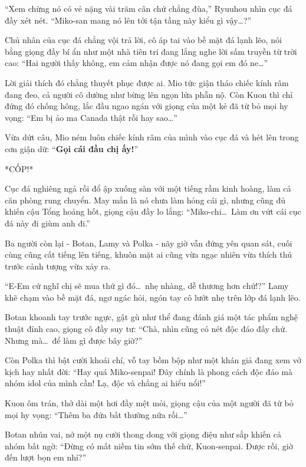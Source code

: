 \documentclass[../main.tex]{subfiles}
\begin{document}
``Xem chừng nó có vẻ nặng vài trăm cân chứ chẳng đùa,'' Ryuuhou nhìn cục đá đầy xét nét. ``Miko-san mang nó lên tới tận tầng này kiểu gì vậy\dots?''

Chủ nhân của cục đá chẳng vội trả lời, cô áp tai vào bề mặt đá lạnh lẽo, nói bằng giọng đầy bí ẩn như một nhà tiên tri đang lắng nghe lời sấm truyền từ trời cao: ``Hai người thấy không, em cảm nhận được nó đang gọi em đó ne\dots''

Lời giải thích đó chẳng thuyết phục được ai. Mio tức giận tháo chiếc kính râm đang đeo, cả người cô dường như bừng lên ngọn lửa phẫn nộ. Còn Kuon thì chỉ đứng đó chống hông, lắc đầu ngao ngán với giọng của một kẻ đã từ bỏ mọi hy vọng: ``Em bị ảo ma Canada thật rồi hay sao\dots''

Vừa dứt câu, Mio ném luôn chiếc kính râm của mình vào cục đá và hét lên trong cơn giận dữ: ``\textbf{Gọi cái đầu chị ấy!}''

*CỐP!*

Cục đá nghiêng ngả rồi đổ ập xuống sàn với một tiếng rầm kinh hoàng, làm cả căn phòng rung chuyển. May mắn là nó chưa làm hỏng cái gì, nhưng cũng đủ khiến cậu Tổng hoảng hốt, giọng cậu đầy lo lắng: ``Miko-chi\dots\ Làm ơn vứt cái cục đá này đi giùm anh đi.''


Ba người còn lại - Botan, Lamy và Polka - nãy giờ vẫn đứng yên quan sát, cuối cùng cũng cất tiếng lên tiếng, khuôn mặt ai cũng vừa ngạc nhiên vừa thích thú trước cảnh tượng vừa xảy ra.

``E-Em cứ nghĩ chị sẽ mua thứ gì đó\dots\ nhẹ nhàng, dễ thương hơn chứ!?'' Lamy khẽ chạm vào bề mặt đá, ngơ ngác hỏi, ngón tay cô lướt nhẹ trên lớp đá lạnh lẽo.

Botan khoanh tay trước ngực, gật gù như thể đang đánh giá một tác phẩm nghệ thuật đỉnh cao, giọng cô đầy suy tư: ``Chà, nhìn cũng có nét độc đáo đấy chứ. Nhưng mà\dots\ để làm gì được bây giờ?''

Còn Polka thì bật cười khoái chí, vỗ tay bồm bộp như một khán giả đang xem vở kịch hay nhất đời: ``Hay quá Miko-senpai! Đây chính là phong cách độc đáo mà nhóm idol của mình cần! Lạ, độc và chẳng ai hiểu nổi!''

Kuon ôm trán, thở dài một hơi đầy mệt mỏi, giọng cậu của một người đã từ bỏ mọi hy vọng: ``Thêm ba đứa bất thường nữa rồi\dots''

Botan nhún vai, nở một nụ cười thong dong với giọng điệu như sắp khiến cả nhóm bất ngờ: ``Đừng có mất niềm tin sớm thế chứ, Kuon-senpai. Được rồi, giờ đến lượt bọn em nhỉ?''
\end{document}

